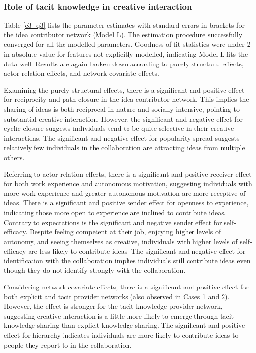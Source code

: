 \subsubsection{Role of tacit knowledge in creative interaction}

Table \ref{c3_q3} lists the parameter estimates with standard errors in brackets for the idea contributor network (Model L). The estimation procedure successfully converged for all the modelled parameters. Goodness of fit statistics were under 2 in absolute value for features not explicitly modelled, indicating Model L fits the data well. Results are again broken down according to purely structural effects, actor-relation effects, and network covariate effects.\medskip 

Examining the purely structural effects, there is a significant and positive effect for reciprocity and path closure in the idea contributor network. This implies the sharing of ideas is both reciprocal in nature and socially intensive, pointing to substantial creative interaction. However, the significant and negative effect for cyclic closure suggests individuals tend to be quite selective in their creative interactions. The significant and negative effect for popularity spread suggests relatively few individuals in the collaboration are attracting ideas from multiple others.\medskip

Referring to actor-relation effects, there is a significant and positive receiver effect for both work experience and autonomous motivation, suggesting individuals with more work experience and greater autonomous motivation are more receptive of ideas. There is a significant and positive sender effect for openness to experience, indicating those more open to experience are inclined to contribute ideas. Contrary to expectations is the significant and negative sender effect for self-efficacy. Despite feeling competent at their job, enjoying higher levels of autonomy, and seeing themselves as creative, individuals with higher levels of self-efficacy are less likely to contribute ideas. The significant and negative effect for identification with the collaboration implies individuals still contribute ideas even though they do not identify strongly with the collaboration.\medskip

Considering network covariate effects, there is a significant and positive effect for both explicit and tacit provider networks (also observed in Cases 1 and 2). However, the effect is stronger for the tacit knowledge provider network, suggesting creative interaction is a little more likely to emerge through tacit knowledge sharing than explicit knowledge sharing. The significant and positive effect for hierarchy indicates individuals are more likely to contribute ideas to people they report to in the collaboration.
      

